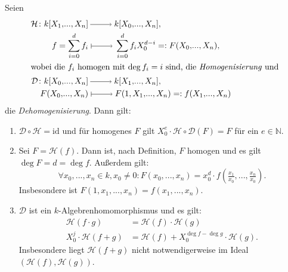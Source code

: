 \documentclass[a4paper,12pt,index=toc]{scrbook}
\theoremstyle{keinenummern} %
\newcommand{\DD}{\mathcal{D}} %
\renewcommand{\H}{\mathcal{H}} %
\newcommand{\id}{\mathrm{id}}
\renewcommand{\dotsc}{\ensuremath{\!...}}
\newcommand{\set}[1]{\ensuremath{\mathbb{#1}}}
\newcommand{\N}{\set{N}}
\newcommand{\polyx}[1][n]{\ensuremath%
  [X_{1},\dotsc,X_{#1}]}
\newcommand{\ppolyx}[1][n]{\ensuremath%
  [X_{0},\dotsc,X_{#1}]}
\begin{document}
\begin{dl}\label{2.3.9} Seien
\begin{align*}\H\colon k\polyx&\ra k\ppolyx,\\
 f=\sum_{i=0}^{d}f_{i}&\mapsto\sum_{i=0}^{d}f_{i}X_{0}^{d-i}=:F(X_{0},\dotsc,X_{n}),\\
\intertext{wobei die $f_{i}$ homogen mit $\deg f_{i}=i$ sind, die \emph{Homogenisierung\index{Homogenisierung}} und}
\DD\colon k\ppolyx&\ra k\polyx,\\
F(X_{0},\dotsc,X_{n})&\mapsto F(1,X_{1},\dotsc,X_{n})=:f(X_{1},\dotsc,X_{n})\end{align*}
die \emph{Dehomogenisierung}. Dann gilt:
\begin{enumerate}
\item{} $\DD\circ \H=\id$ und für homogenes $F$ gilt $X_{0}^{e}\cdot \H\circ \DD(F)=F$ für ein $e\in\N$.
\item{} Sei $F=\H(f)$. Dann ist, nach Definition, $F$ homogen und es gilt $\deg F=d=\deg f$. Außerdem gilt:\vspace*{-6pt}
\begin{equation*}\forall x_{0},\dotsc,x_{n}\in k, x_{0}\neq 0\colon  F(x_{0},\dotsc,x_{n})=x_{0}^{d}\cdot f(\tfrac{x_{1}}{x_{0}},\dotsc,\tfrac{x_{n}}{x_{0}}).\end{equation*}
Insbesondere ist $F(1,x_{1},\dotsc,x_{n}) = f(x_{1},\dotsc,x_{n})$.
\item{} $\DD$ ist ein $k$-Algebrenhomomorphismus und es gilt:
\begin{align*}
\H(f\cdot g)&=\H(f)\cdot \H(g)\\
X_{0}^{j}\cdot\H(f+g)&=\H(f)+X_{0}^{\deg f-\deg g}\cdot \H(g).\end{align*}
Insbesondere liegt $\H(f+g)$ nicht notwendigerweise im Ideal $(\H(f),\H(g))$.
\end{enumerate}\end{dl}
%
\end{document}

